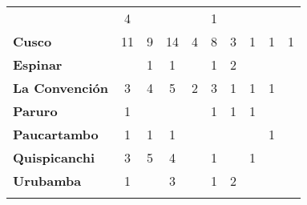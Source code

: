 \begin{tabular}{lccccccccc}
	&4											&\cellcolor[HTML]{FCC46C}
	&\cellcolor[HTML]{FCC46C}					&\cellcolor[HTML]{FCC46C}
	&1\\
	\textbf{Cusco}                            										
	&11											&9 	
	&14 										&4
	&8											&3
	&1											&1
	&1\\
	\textbf{Espinar}       					             								
	 &\cellcolor[HTML]{FCC46C}
	&1											&1
	&\cellcolor[HTML]{FCC46C}					&1
	&2											&\cellcolor[HTML]{FCC46C}	
	&\cellcolor[HTML]{FCC46C} 					&\cellcolor[HTML]{FCC46C}\\
	\textbf{La Convención}                      					
	&3
	&4											&5
	&2											&3
	&1 											&1 
	&1											&\cellcolor[HTML]{FCC46C}\\
	\textbf{Paruro}                            					
	&1
	&\cellcolor[HTML]{FCC46C}					&\cellcolor[HTML]{FCC46C}
	&\cellcolor[HTML]{FCC46C} 					&1
	&1											&1
	&\cellcolor[HTML]{FCC46C}					&\cellcolor[HTML]{FCC46C}\\
	\textbf{Paucartambo}               		                       					
	&1											&1		
	&1											&\cellcolor[HTML]{FCC46C}
	&\cellcolor[HTML]{FCC46C}
	&\cellcolor[HTML]{FCC46C}					&\cellcolor[HTML]{FCC46C}
	&1											&\cellcolor[HTML]{FCC46C}\\
	\textbf{Quispicanchi}                                         	                 	
	&3											&5
	&4											&\cellcolor[HTML]{FCC46C}
	&1											&\cellcolor[HTML]{FCC46C}
	&1											&\cellcolor[HTML]{FCC46C}
	&\cellcolor[HTML]{FCC46C}\\
	\textbf{Urubamba}                                                          			
	&1
	&\cellcolor[HTML]{FCC46C}					&3
	&\cellcolor[HTML]{FCC46C}					&1
	&2											&\cellcolor[HTML]{FCC46C}
	&\cellcolor[HTML]{FCC46C}					&\cellcolor[HTML]{FCC46C}\\	
	&\multicolumn{1}{l}{}                       &\multicolumn{1}{l}{}            &\multicolumn{1}{l}{}                         
	&\multicolumn{1}{l}{}                       &\multicolumn{1}{l}{}            &\multicolumn{1}{l}{}                       &\multicolumn{1}{l}{}                       &\multicolumn{1}{l}{}            &\multicolumn{1}{l}{}    
\end{tabular}